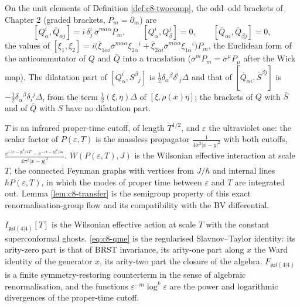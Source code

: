 \begin{remark}
On the unit elements of Definition \ref{def:c8-twocomp}, the odd--odd brackets of Chapter 2 (graded brackets, $P_m=\partial_m$) are
\[
[Q^i_\alpha,\bar Q_{\dot\alpha j}]=i\,\delta^i_j\,\bar\sigma^{m\dot\alpha\alpha}P_m,\qquad [Q^i_\alpha,Q^j_\beta]=0,\qquad [\bar Q_{\dot\alpha i},\bar Q_{\dot\beta j}]=0,
\]
the values of $[\xi_1,\xi_2]=i\big(\bar\xi_{1\dot\alpha i}\bar\sigma^{m\dot\alpha\alpha}\xi_{2\alpha}{}^i+\bar\xi_{2\dot\alpha i}\bar\sigma^{m\dot\alpha\alpha}\xi_{1\alpha}{}^i\big)P_m$, the Euclidean form of the anticommutator of $Q$ and $\bar Q$ into a translation ($\bar\sigma^mP_m=\bar\sigma^\mu P_\mu$ after the Wick map). The dilatation part of $[Q^i_\alpha,S^\beta{}_j]$ is $\tfrac12\delta_\alpha{}^\beta\delta^i{}_j\Delta$ and that of $[\bar Q_{\dot\alpha i},\bar S^{\dot\beta j}]$ is $-\tfrac12\delta_{\dot\alpha}{}^{\dot\beta}\delta_i{}^j\Delta$, from the term $\tfrac12(\xi,\eta)\Delta$ of $[\xi,\rho(x)\eta]$; the brackets of $Q$ with $\bar S$ and of $\bar Q$ with $S$ have no dilatation part.
\end{remark}

\begin{remark}
$T$ is an infrared proper-time cutoff, of length $T^{1/2}$, and $\varepsilon$ the ultraviolet one: the scalar factor of $P(\varepsilon,T)$ is the massless propagator $\frac1{4\pi^2|x-y|^2}$ with both cutoffs, $\frac{e^{-|x-y|^2/4T}-e^{-|x-y|^2/4\varepsilon}}{4\pi^2|x-y|^2}$. $W(P(\varepsilon,T),J)$ is the Wilsonian effective interaction at scale $T$, the connected Feynman graphs with vertices from $J/\hbar$ and internal lines $\hbar P(\varepsilon,T)$, in which the modes of proper time between $\varepsilon$ and $T$ are integrated out. Lemma \ref{lem:c8-transfer} is the semigroup property of this exact renormalisation-group flow and its compatibility with the BV differential.
\end{remark}

\begin{remark}
$I_{\mathfrak{psl}(4|4)}[T]$ is the Wilsonian effective action at scale $T$ with the constant superconformal ghosts. \eqref{eq:c8-qme} is the regularised Slavnov--Taylor identity: its arity-zero part is that of BRST invariance, its arity-one part along $x$ the Ward identity of the generator $x$, its arity-two part the closure of the algebra. $F_{\mathfrak{psl}(4|4)}$ is a finite symmetry-restoring counterterm in the sense of algebraic renormalisation, and the functions $\varepsilon^{-m}\log^k\varepsilon$ are the power and logarithmic divergences of the proper-time cutoff.
\end{remark}

